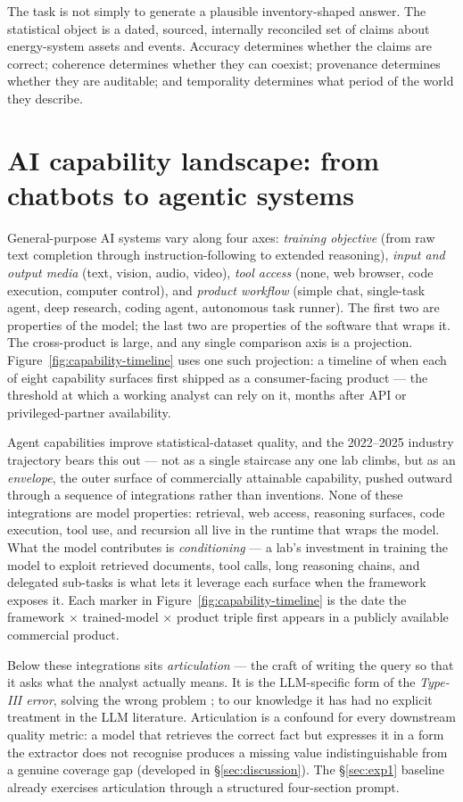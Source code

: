 \documentclass[a4paper,11pt]{article}
\begin{document}
The task is not simply to generate a plausible inventory-shaped answer.
The statistical object is a dated, sourced, internally reconciled set of
claims about energy-system assets and events. Accuracy determines
whether the claims are correct; coherence determines whether they can
coexist; provenance determines whether they are auditable; and
temporality determines what period of the world they describe.

\section{AI capability landscape: from chatbots to agentic
systems}\label{sec:capability}

General-purpose AI systems vary along four axes: \emph{training
objective} (from raw text completion through instruction-following to
extended reasoning), \emph{input and output media} (text, vision, audio,
video), \emph{tool access} (none, web browser, code execution, computer
control), and \emph{product workflow} (simple chat, single-task agent,
deep research, coding agent, autonomous task runner). The first two are
properties of the model; the last two are properties of the software
that wraps it. The cross-product is large, and any single comparison
axis is a projection. Figure~\ref{fig:capability-timeline} uses one such
projection: a timeline of when each of eight capability surfaces first
shipped as a consumer-facing product --- the threshold at which a
working analyst can rely on it, months after API or privileged-partner
availability.

Agent capabilities improve statistical-dataset quality, and the
2022--2025 industry trajectory bears this out --- not as a single
staircase any one lab climbs, but as an \emph{envelope}, the outer
surface of commercially attainable capability, pushed outward through a
sequence of integrations rather than inventions. None of these
integrations are model properties: retrieval, web access, reasoning
surfaces, code execution, tool use, and recursion all live in the
runtime that wraps the model. What the model contributes is
\emph{conditioning} --- a lab's investment in training the model to
exploit retrieved documents, tool calls, long reasoning chains, and
delegated sub-tasks is what lets it leverage each surface when the
framework exposes it. Each marker in
Figure~\ref{fig:capability-timeline} is the date the framework ×
trained-model × product triple first appears in a publicly available
commercial product.

Below these integrations sits \emph{articulation} --- the craft of
writing the query so that it asks what the analyst actually means. It is
the LLM-specific form of the \emph{Type-III error}, solving the wrong
problem \citep{Mitroff1974}; to our knowledge it has had no explicit
treatment in the LLM literature. Articulation is a confound for every
downstream quality metric: a model that retrieves the correct fact but
expresses it in a form the extractor does not recognise produces a
missing value indistinguishable from a genuine coverage gap (developed
in §\ref{sec:discussion}). The §\ref{sec:exp1} baseline already
exercises articulation through a structured four-section prompt.
\end{document}
